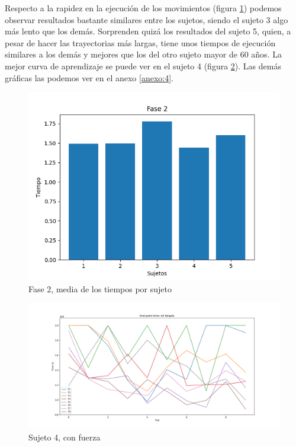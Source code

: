 \documentclass[a4paper,11pt, oneside]{book}
\begin{document}
Respecto a la rapidez en la ejecución de los movimientos (figura \ref{fase2-time}) podemos observar resultados bastante similares entre los sujetos, siendo el sujeto 3  algo más lento que los demás. Sorprenden quizá los resultados del sujeto 5, quien, a pesar de hacer las trayectorias más largas, tiene unos tiempos de ejecución similares a los demás y mejores que los del otro sujeto mayor de 60 años. La mejor curva de aprendizaje se puede ver en el sujeto 4 (figura \ref{4-2-3}). Las demás gráficas las podemos ver en el anexo \ref{anexo:4}.

\begin{figure}[H]
	\includegraphics[width=\linewidth]{fase2-time}
	\caption{Fase 2, media de los tiempos por sujeto}
	\label{fase2-time}
\end{figure}


\begin{figure}[H]
	\includegraphics[width=\linewidth]{sujeto4/force/evolution_time}
	\caption{Sujeto 4, con fuerza}
	\label{4-2-3}
\end{figure}
\end{document}
